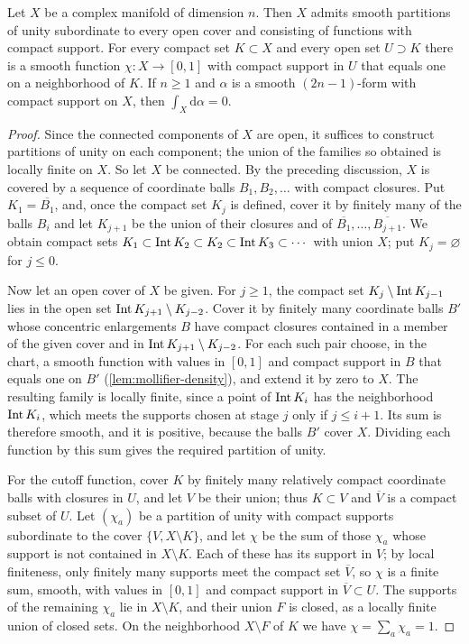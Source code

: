 \begin{proposition}\label{prop:manifold-cutoffs-stokes}
Let $X$ be a complex manifold of dimension $n$. Then $X$ admits smooth partitions of unity subordinate to every open cover and consisting of functions with compact support. For every compact set $K\subset X$ and every open set $U\supset K$ there is a smooth function $\chi\colon X\to[0,1]$ with compact support in $U$ that equals one on a neighborhood of $K$. If $n\geq1$ and $\alpha$ is a smooth $(2n-1)$-form with compact support on $X$, then $\int_X\mathrm{d}\alpha=0$.
\end{proposition}
\begin{proof}
Since the connected components of $X$ are open, it suffices to construct partitions of unity on each component; the union of the families so obtained is locally finite on $X$. So let $X$ be connected. By the preceding discussion, $X$ is covered by a sequence of coordinate balls $B_1,B_2,\ldots$ with compact closures. Put $K_1=\overline{B_1}$, and, once the compact set $K_j$ is defined, cover it by finitely many of the balls $B_i$ and let $K_{j+1}$ be the union of their closures and of $\overline{B_1},\ldots,\overline{B_{j+1}}$. We obtain compact sets $K_1\subset\operatorname{Int} K_2\subset K_2\subset\operatorname{Int} K_3\subset\cdots$ with union $X$; put $K_j=\varnothing$ for $j\leq0$.

Now let an open cover of $X$ be given. For $j\geq1$, the compact set $K_j\setminus\operatorname{Int} K_{j-1}$ lies in the open set $\operatorname{Int} K_{j+1}\setminus K_{j-2}$. Cover it by finitely many coordinate balls $B'$ whose concentric enlargements $B$ have compact closures contained in a member of the given cover and in $\operatorname{Int} K_{j+1}\setminus K_{j-2}$. For each such pair choose, in the chart, a smooth function with values in $[0,1]$ and compact support in $B$ that equals one on $B'$ (\cref{lem:mollifier-density}), and extend it by zero to $X$. The resulting family is locally finite, since a point of $\operatorname{Int} K_i$ has the neighborhood $\operatorname{Int} K_i$, which meets the supports chosen at stage $j$ only if $j\leq i+1$. Its sum is therefore smooth, and it is positive, because the balls $B'$ cover $X$. Dividing each function by this sum gives the required partition of unity.

For the cutoff function, cover $K$ by finitely many relatively compact coordinate balls with closures in $U$, and let $V$ be their union; thus $K\subset V$ and $\overline V$ is a compact subset of $U$. Let $(\chi_a)$ be a partition of unity with compact supports subordinate to the cover $\{V,X\setminus K\}$, and let $\chi$ be the sum of those $\chi_a$ whose support is not contained in $X\setminus K$. Each of these has its support in $V$; by local finiteness, only finitely many supports meet the compact set $\overline V$, so $\chi$ is a finite sum, smooth, with values in $[0,1]$ and compact support in $\overline V\subset U$. The supports of the remaining $\chi_a$ lie in $X\setminus K$, and their union $F$ is closed, as a locally finite union of closed sets. On the neighborhood $X\setminus F$ of $K$ we have $\chi=\sum_a\chi_a=1$.


\end{proof}
